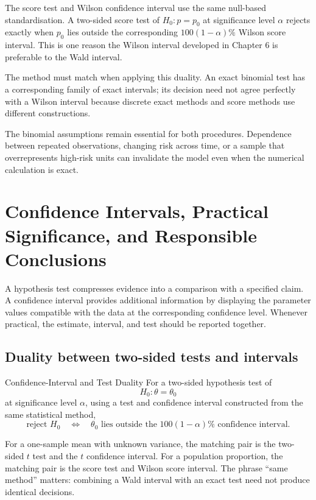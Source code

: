 The score test and Wilson confidence interval use the same null-based standardisation. A two-sided score test of $H_0:p=p_0$ at significance level $\alpha$ rejects exactly when $p_0$ lies outside the corresponding $100(1-\alpha)\%$ Wilson score interval. This is one reason the Wilson interval developed in Chapter 6 is preferable to the Wald interval.

The method must match when applying this duality. An exact binomial test has a corresponding family of exact intervals; its decision need not agree perfectly with a Wilson interval because discrete exact methods and score methods use different constructions.

The binomial assumptions remain essential for both procedures. Dependence between repeated observations, changing risk across time, or a sample that overrepresents high-risk units can invalidate the model even when the numerical calculation is exact.

\section{Confidence Intervals, Practical Significance, and Responsible Conclusions}
\label{sec:testing-responsible-conclusions}

A hypothesis test compresses evidence into a comparison with a specified claim. A confidence interval provides additional information by displaying the parameter values compatible with the data at the corresponding confidence level. Whenever practical, the estimate, interval, and test should be reported together.

\subsection{Duality between two-sided tests and intervals}

\begin{theorem}{Confidence-Interval and Test Duality}
For a two-sided hypothesis test of
\[
H_0:\theta=\theta_0
\]
at significance level $\alpha$, using a test and confidence interval constructed from the same statistical method,
\[
\text{reject }H_0
\quad\Longleftrightarrow\quad
\theta_0\text{ lies outside the }100(1-\alpha)\%\text{ confidence interval}.
\]
\end{theorem}

For a one-sample mean with unknown variance, the matching pair is the two-sided $t$ test and the $t$ confidence interval. For a population proportion, the matching pair is the score test and Wilson score interval. The phrase ``same method'' matters: combining a Wald interval with an exact test need not produce identical decisions.

